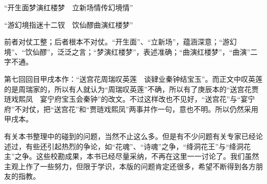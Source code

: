 “开生面梦演红楼梦　立新场情传幻境情”

“游幻境指迷十二钗　饮仙醪曲演红楼梦”

前者对仗工整；后者根本不对仗。“开生面”、“立新场”，蕴涵深意；“游幻境”、“饮仙醪”，泛泛之言；“梦演红楼梦”，表述准确；“曲演红楼梦”，“曲演”二字不通。

第七回回目甲戌本作：“送宫花周瑞叹英莲　谈肄业秦钟结宝玉”。而正文中叹英莲的是周瑞家的，所以有人就认为“周瑞叹英莲”不确，\hyperref[label-2]{\textsuperscript{}}所以有了庚辰本的“送宫花贾琏戏熙凤　宴宁府宝玉会秦钟”的改文。不过这样改也不见好，“送宫花”与“宴宁府”不对仗，把“送宫花”和“贾琏戏熙凤”两事并作一句，意也不明。所以仍然采用甲戌本。




有关本书整理中的碰到的问题，当然不止这么多。但是有不少问题有关专家已经论述过，有些还引起热烈的争论，如“花魂”、“诗魂”之争，“绛洞花王”与“绛洞花主”之争。这些校勘成果，本书已经尽量采纳，不再在这里一一讨论了。我们虽然主观上作了一些努力，但限于学识，本版的问题肯定还很多，希望不断得到各方朋友的指教。